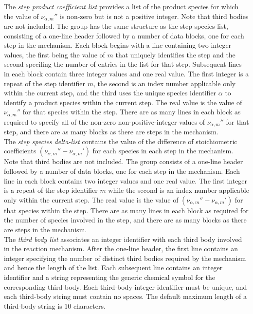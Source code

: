 \documentclass[dvips]{article}
\begin{document}
\noindent
The {\it step product coefficient list} 
provides a list of the product species for which the value of 
$\nu_{\alpha,m}''$ is non-zero but is not a positive integer.
Note that third bodies are not included.
The group has the same
structure as the step species list, consisting of a 
one-line header followed by a number of data blocks, one for each step
in the mechanism.  Each block begins with a line containing two
integer values, the first being the value of $m$ that uniquely
identifies the step and the second specifing the number of entries in
the list for that step.  Subsequent lines in each block contain three
integer values and one real value.  The first integer is a repeat of the step
identifier $m$, the second
is an index number applicable only within the current step, and the
third uses the unique species identifier $\alpha$ to identify a product
species within the current step.  The real value is the value of
$\nu_{\alpha,m}''$ for that species within the step.  There are as many
lines in each block as required to specify all of the non-zero
non-positive-integer values of $\nu_{\alpha,m}''$ for that step,
and there are as many
blocks as there are steps in the mechanism.\\

\noindent
The {\it step species delta-list} contains the value of
the difference of stoichiometric coefficients
$\left(\nu_{\alpha,m}''-\nu_{\alpha,m}'\right)$
for each species in
each step in the mechanism.  Note that third bodies are not included.
The group consists of a 
one-line header followed by a number of data blocks, one for each step
in the mechanism.  Each line in each block contains two
integer values and one real value.  The first integer is a repeat of the step
identifier $m$ while the second
is an index number applicable only within the current step.
The real value is the value of
$\left(\nu_{\alpha,m}''-\nu_{\alpha,m}'\right)$
for that species within the step.  There are as many
lines in each block as required for the number of species involved in the step,
and there are as many
blocks as there are steps in the mechanism.\\

\noindent
The {\it third body list} associates an integer identifier with each third body
involved in the reaction mechanism.  After the one-line header,
the first line contains an integer specifying the number of distinct
third bodies required by the mechanism and hence the length of the list.  Each
subsequent line contains an
integer identifier and a string representing the generic chemical symbol for
the corresponding third body.
Each third-body integer identifier must be unique, and each third-body
string must contain no spaces.  The default maximum length of a third-body
string is 10 characters.\\
\end{document}
